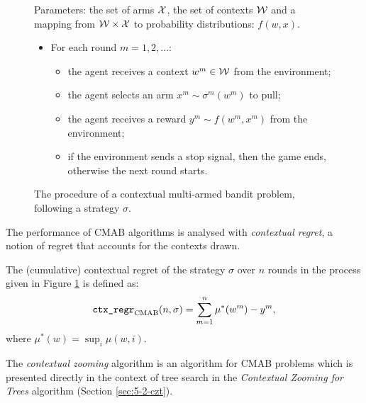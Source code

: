     \begin{figure}
        \begin{tcolorbox}
            Parameters: the set of arms $\mathcal{X}$, the set of contexts $\mathcal{W}$ and a mapping from $\mathcal{W}\times\mathcal{X}$ to probability distributions: $f(w,x)$.
            \begin{itemize}
                \item For each round $m=1,2,\ldots$:
                \begin{itemize}
                    \item the agent receives a context $w^m\in\mathcal{W}$ from the environment;
                    \item the agent selects an arm $x^m\sim\sigma^m(w^m)$ to pull;
                    \item the agent receives a reward $y^m \sim f(w^m,x^m)$ from the environment;
                    \item if the environment sends a stop signal, then the game ends, otherwise the next round starts.
                \end{itemize} 
            \end{itemize}
        \end{tcolorbox}
        \caption{The procedure of a contextual multi-armed bandit problem, following a strategy $\sigma$.}
        \label{fig:2:cmab_problem}
    \end{figure}

    The performance of CMAB algorithms is analysed with \textit{contextual regret}, a notion of regret that accounts for the contexts drawn.
    \begin{defn}
        \label{def:2:contextual_regret}
        The \textnormal{(cumulative) contextual regret} of the strategy $\sigma$ over $n$ rounds in the process given in Figure \ref{fig:2:cmab_problem} is defined as:
        \begin{align}
            {\textnormal{\texttt{ctx\_regr}}}_{{\textnormal{CMAB}}}(n,\sigma) = \sum_{m=1}^n \mu^*(w^m) - y^m, \label{eq:2:contextual_regret_def}
        \end{align}
        where $\mu^*(w) = \sup_i \mu(w,i)$.
    \end{defn}

    The \textit{contextual zooming} algorithm \cite{cz} is an algorithm for CMAB problems which is presented directly in the context of tree search in the \textit{Contextual Zooming for Trees} algorithm (Section \ref{sec:5-2-czt}).
    
    













